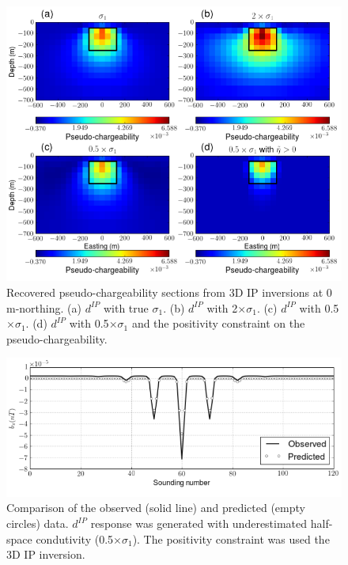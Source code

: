 \documentclass[a4paper, 11pt]{article}
\newcommand{\dip}{d^{IP}}
\begin{document}
\begin{figure}[htb]
  \centering
  \includegraphics[width=1.\textwidth]{figures/Regional_IPInv.png}
  \caption{Recovered pseudo-chargeability sections from 3D IP inversions at 0 m-northing. (a) $\dip$ with true $\sigma_1$. (b) $\dip$ with 2$\times \sigma_1$. (c) $\dip$ with 0.5$\times \sigma_1$. (d) $\dip$ with 0.5$\times \sigma_1$ and the positivity constraint on the pseudo-chargeability.}
  \label{F:Regional_IPInv}
\end{figure}

\begin{figure}[htb]
  \centering
  \includegraphics[width=1.\textwidth]{figures/Reg_obspred.png}
  \caption{Comparison of the observed (solid line) and predicted (empty circles) data. $\dip$ response was generated with underestimated half-space condutivity (0.5$\times \sigma_1$). The positivity constraint was used the 3D IP inversion.}
  \label{F:Reg_obspred}
\end{figure}
\end{document}

